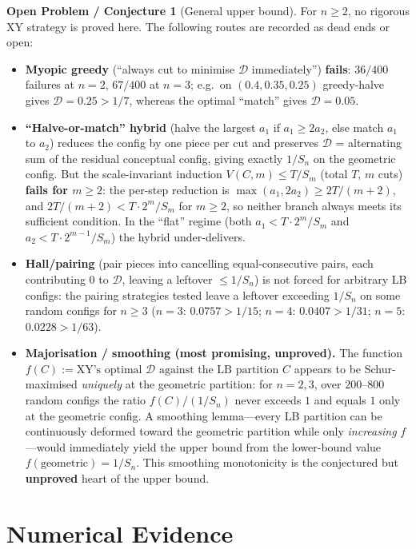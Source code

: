 \documentclass[11pt]{article}
\theoremstyle{definition}
\newtheorem*{openproblem}{Open Problem / Conjecture}
\newcommand{\D}{\mathcal{D}}
\newcommand{\XY}{\mathrm{XY}}
\begin{document}
\begin{openproblem}[General upper bound]
For $n\ge 2$, no rigorous XY strategy is proved here. The following routes are
recorded as dead ends or open:
\begin{itemize}[leftmargin=2em]
\item \textbf{Myopic greedy} (``always cut to minimise $\D$ immediately'')
\textbf{fails}: $36/400$ failures at $n=2$, $67/400$ at $n=3$; e.g.\ on
$(0.4,0.35,0.25)$ greedy-halve gives $\D=0.25>1/7$, whereas the optimal
``match'' gives $\D=0.05$.
\item \textbf{``Halve-or-match'' hybrid} (halve the largest $a_1$ if
$a_1\ge 2a_2$, else match $a_1$ to $a_2$) reduces the config by one piece per
cut and preserves $\D$ = alternating sum of the residual conceptual config,
giving exactly $1/S_n$ on the geometric config. But the scale-invariant
induction $V(C,m)\le T/S_m$ (total $T$, $m$ cuts) \textbf{fails for $m\ge 2$}:
the per-step reduction is $\max(a_1,2a_2)\ge 2T/(m+2)$, and
$2T/(m+2)<T\cdot 2^m/S_m$ for $m\ge 2$, so neither branch always meets its
sufficient condition. In the ``flat'' regime (both $a_1<T\cdot 2^m/S_m$ and
$a_2<T\cdot 2^{m-1}/S_m$) the hybrid under-delivers.
\item \textbf{Hall/pairing} (pair pieces into cancelling equal-consecutive
pairs, each contributing $0$ to $\D$, leaving a leftover $\le 1/S_n$) is not
forced for arbitrary LB configs: the pairing strategies tested leave a leftover
exceeding $1/S_n$ on some random configs for $n\ge 3$
($n=3$: $0.0757>1/15$; $n=4$: $0.0407>1/31$; $n=5$: $0.0228>1/63$).
\item \textbf{Majorisation / smoothing (most promising, unproved).} The
function $f(C):=\XY\text{'s optimal }\D\text{ against the LB partition }C$
appears to be Schur-maximised \emph{uniquely} at the geometric partition: for
$n=2,3$, over $200$--$800$ random configs the ratio
$f(C)/(1/S_n)$ never exceeds $1$ and equals $1$ only at the geometric config.
A smoothing lemma---every LB partition can be continuously deformed toward the
geometric partition while only \emph{increasing} $f$---would immediately yield
the upper bound from the lower-bound value $f(\text{geometric})=1/S_n$. This
smoothing monotonicity is the conjectured but \textbf{unproved} heart of the
upper bound.
\end{itemize}
\end{openproblem}

\section{Numerical Evidence}
\end{document}
